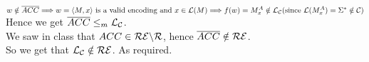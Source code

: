 $w \notin \overline{ACC} \\
    \Longrightarrow w = \langle M, x \rangle \text{ is a valid encoding and } x \in \mathcal{L}(M) \\
    \Longrightarrow f(w) = M_x^A \notin \mathcal{L}_{\mathcal{C}} (\text{since } \mathcal{L}(M_x^A) = \Sigma^* \notin \mathcal{C})$ \\

Hence we get $\overline{ACC} \leq_m \mathcal{L}_{\mathcal{C}}$. \\
We saw in class that $ACC \in \mathcal{R}\mathcal{E} \backslash \mathcal{R}$, hence $\overline{ACC} \notin \mathcal{R}\mathcal{E}$. \\
So we get that $\mathcal{L}_{\mathcal{C}} \notin \mathcal{R}\mathcal{E}$. As required. \\